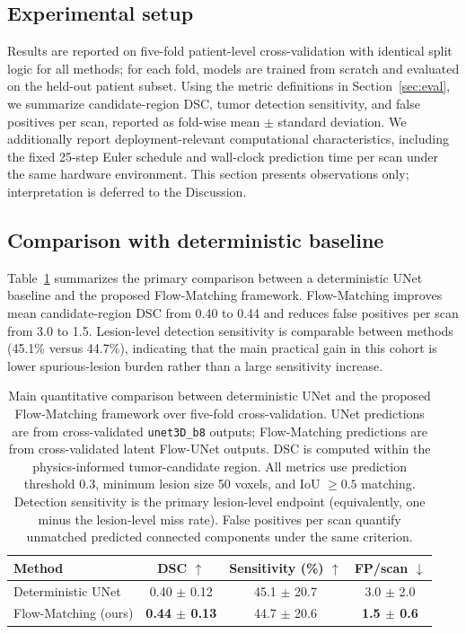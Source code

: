 \documentclass{iopjournal}
\begin{document}
\subsection{Experimental setup}
Results are reported on five-fold patient-level cross-validation with identical split logic for all methods; for each fold, models are trained from scratch and evaluated on the held-out patient subset. Using the metric definitions in Section~\ref{sec:eval}, we summarize candidate-region DSC, tumor detection sensitivity, and false positives per scan, reported as fold-wise mean $\pm$ standard deviation. We additionally report deployment-relevant computational characteristics, including the fixed 25-step Euler schedule and wall-clock prediction time per scan under the same hardware environment. This section presents observations only; interpretation is deferred to the Discussion.

\subsection{Comparison with deterministic baseline}\label{sec:comparison}
Table~\ref{tab:main_comparison} summarizes the primary comparison between a deterministic UNet baseline and the proposed Flow-Matching framework. Flow-Matching improves mean candidate-region DSC from 0.40 to 0.44 and reduces false positives per scan from 3.0 to 1.5. Lesion-level detection sensitivity is comparable between methods (45.1\% versus 44.7\%), indicating that the main practical gain in this cohort is lower spurious-lesion burden rather than a large sensitivity increase.

\begin{table}
\caption{\label{tab:main_comparison}Main quantitative comparison between deterministic UNet and the proposed Flow-Matching framework over five-fold cross-validation. UNet predictions are from cross-validated \texttt{unet3D\_b8} outputs; Flow-Matching predictions are from cross-validated latent Flow-UNet outputs. DSC is computed within the physics-informed tumor-candidate region. All metrics use prediction threshold 0.3, minimum lesion size 50 voxels, and IoU $\ge 0.5$ matching. Detection sensitivity is the primary lesion-level endpoint (equivalently, one minus the lesion-level miss rate). False positives per scan quantify unmatched predicted connected components under the same criterion.}
\begin{center}
\begin{tabular}{lccc}
\hline
Method & DSC $\uparrow$ & Sensitivity (\%) $\uparrow$ & FP/scan $\downarrow$ \\
\hline
Deterministic UNet & 0.40 $\pm$ 0.12 & 45.1 $\pm$ 20.7 & 3.0 $\pm$ 2.0 \\
Flow-Matching (ours) & \textbf{0.44 $\pm$ 0.13} & 44.7 $\pm$ 20.6 & \textbf{1.5 $\pm$ 0.6} \\
\hline
\end{tabular}
\end{center}
\end{table}
\end{document}

